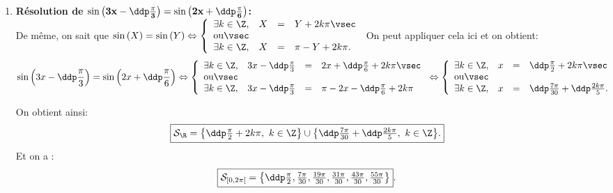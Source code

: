 \begin{correction}
\begin{enumerate}
\begin{minipage}[c]{0.45\textwidth}
\begin{center}
\end{center}
\end{minipage}
\item \textbf{R\'esolution de $\mathbf{\sin{\left(3x-\ddp\frac{\pi}{3}\right)}=\sin{\left(2x+\ddp\frac{\pi}{6}\right)}}$:}\\
\noindent De m\^{e}me, on sait que $\sin{(X)}=\sin{(Y)}\Leftrightarrow \left\lbrace\begin{array}{llll}  \exists k\in\Z,& X&=& Y+2k\pi\vsec\\ \hbox{ou}\vsec\\ \exists k\in\Z,& X&=& \pi-Y+2k\pi.    \end{array}\right.$ On peut appliquer cela ici et on obtient:
$$\sin{\left(3x-\ddp\frac{\pi}{3}\right)}=\sin{\left(2x+\ddp\frac{\pi}{6}\right)} \Leftrightarrow \left\lbrace\begin{array}{llll}  \exists k\in\Z,& 3x-\ddp\frac{\pi}{3}&=& 2x+\ddp\frac{\pi}{6}+2k\pi\vsec\\ \hbox{ou}\vsec\\ \exists k\in\Z,& 3x-\ddp\frac{\pi}{3}&=&\pi-2x-\ddp\frac{\pi}{6}+2k\pi    \end{array}\right. \Leftrightarrow \left\lbrace\begin{array}{llll}  \exists k\in\Z,& x&=& \ddp\frac{\pi}{2}+2k\pi\vsec\\ \hbox{ou}\vsec\\\exists k\in\Z,& x&=& \ddp\frac{7\pi}{30}+\ddp\frac{2k\pi}{5}.    \end{array}\right.$$
\begin{minipage}[c]{0.45\textwidth}
On obtient ainsi:
$$\fbox{$\mathcal{S}_{\R}=\left\lbrace \ddp\frac{\pi}{2}+2k\pi,\ k\in\Z\right\rbrace\cup\left\lbrace \ddp\frac{7\pi}{30}+\ddp\frac{2k\pi}{5},\ k\in\Z\right\rbrace$.}$$
Et on a :
$$\fbox{$\mathcal{S}_{[0,2\pi[}=\left\{ \ddp \frac{\pi}{2}, \frac{7\pi}{30}, \frac{19\pi}{30}, \frac{31\pi}{30}, \frac{43\pi}{30}, \frac{55\pi}{30}\right\}$}.$$
\end{minipage}
\quad \begin{minipage}[c]{0.45\textwidth}

\end{minipage}
\end{enumerate}
\end{correction}
